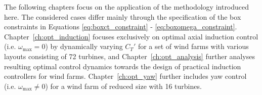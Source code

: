 The following chapters focus on the application of the methodology introduced here. The considered cases differ mainly through the specification of the box constraints in Equations \eqref{eq:boxct_constraint} - \eqref{eq:boxomega_constraint}. Chapter~\ref{ch:opt_induction} focuses exclusively on optimal axial induction control (i.e. $\omega_{\text{max}} = 0$) by dynamically varying $C_T'$ for a set of wind farms with various layouts consisting of 72 turbines, and Chapter~\ref{ch:opt_analysis} further analyses resulting optimal control dynamics towards the design of practical induction controllers for wind farms. Chapter~\ref{ch:opt_yaw} further includes yaw control (i.e. $\omega_{\text{max}} \neq 0$) for a wind farm of reduced size with 16 turbines. 


\cleardoublepage
